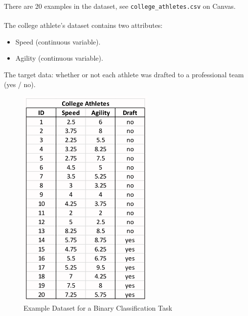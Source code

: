 \documentclass[a4paper,11pt]{article}
\begin{document}
\begin{minipage}{0.5\textwidth}
    There are 20 examples in the dataset, see \verb|college_athletes.csv| on Canvas.
    \\\\
    The college athlete's dataset contains two attributes: 
    \begin{itemize}
        \item   Speed (continuous variable).
        \item   Agility (continuous variable).
    \end{itemize}

    The target data: whether or not each athlete was drafted to a professional team (yes / no).
\end{minipage}
\hfill
\begin{minipage}{0.5\textwidth}
    \begin{figure}[H]
        \centering
        \includegraphics[width=0.6\textwidth]{./images/example_binary_classification.png}
        \caption{Example Dataset for a Binary Classification Task}
    \end{figure}
\end{minipage}
\end{document}
